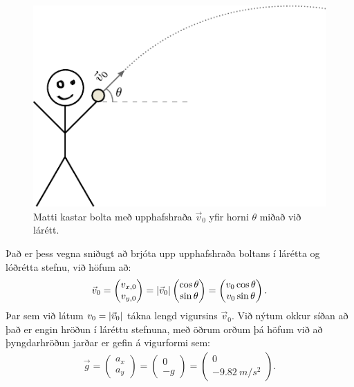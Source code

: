 \ifdefined \wholebook \else\documentclass[oneside]{book}\usepackage{EdlBook}\graphicspath{{figures/}}
\begin{document}
\begin{figure}[H]
    \centering
    \includegraphics{figures/kasta2.pdf}
    \caption{Matti kastar bolta með upphafshraða $\vec{v}_0$ yfir horni $\theta$ miðað við lárétt.}
    \label{fig:kasta}
\end{figure}
Það er þess vegna sniðugt að brjóta upp upphafshraða boltans í lárétta og lóðrétta stefnu, við höfum að:
\begin{align*}
    \vec{v}_0 = \begin{pmatrix} v_{x,0} \\ v_{y,0} \end{pmatrix} = \abs{\vec{v}_0} \begin{pmatrix} \cos\theta \\ \sin\theta \end{pmatrix} = \begin{pmatrix} v_0 \cos\theta \\ v_0 \sin\theta \end{pmatrix}.
\end{align*}
Þar sem við látum $v_0 = \abs{\vec{v}_0}$ tákna lengd vigursins $\vec{v}_0$. Við nýtum okkur síðan að það er engin hröðun í láréttu stefnuna, með öðrum orðum þá höfum við að þyngdarhröðun jarðar er gefin á vigurformi sem:
\begin{align*}
    \vec{g} = \begin{pmatrix} a_x \\ a_y \end{pmatrix}  =  \begin{pmatrix} 0 \\ -g \end{pmatrix} = \begin{pmatrix} 0 \\ -\SI{9.82}{m/s^2} \end{pmatrix}.
\end{align*}
\end{document}
